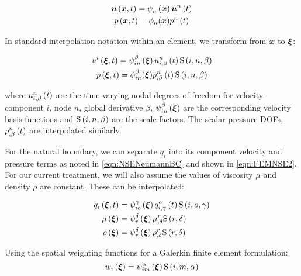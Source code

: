 \begin{gather}
  \fnof{\vectr{u}}{\vectr{x},t}=\gbfn{n}{}{\vectr{x}}\fnof{\nodept{\vectr{u}}{n}}{t}\\
  \fnof{p}{\vectr{x},t}=\phi_{n}({\vectr{x}})\fnof{\nodept{p}{n}}{t}
\end{gather}

In standard interpolation notation within an element, we transform from
$\vectr{x}$ to $\vectr{\xi}$:

\begin{gather}
  \fnof{u^{i}}{\vectr{\xi},t}=\idxgbfn{i}{n}{\beta}{\vectr{\xi}}
  \fnof{\idxnodedof{u}{i}{n}{\beta}}{t}\idxgsf{i}{n}{\beta}\\
  \fnof{p}{\vectr{\xi},t}=\phi_{in}^{\beta}({\vectr{\xi}})
  \fnof{\idxnodedof{p}{}{n}{\beta}}{t}\idxgsf{i}{n}{\beta}
\end{gather}

where $\fnof{\idxnodedof{u}{i}{n}{\beta}}{t}$ are the time varying nodal
degrees-of-freedom for velocity component $i$, node $n$, global derivative
$\beta$, $\idxgbfn{i}{n}{\beta}{\vectr{\xi}}$ are the corresponding velocity
basis functions and $\idxgsf{i}{n}{\beta}$ are the scale factors. The scalar
pressure DOFs, $\fnof{\idxnodedof{p}{}{n}{\beta}}{t}$ are interpolated
similarly.

For the natural boundary, we can separate $q_i$ into its component velocity
and pressure terms as noted in \ref{eqn:NSENeumannBC} and shown in
\ref{eqn:FEMNSE2}. For our current treatment, we will also assume the values
of viscosity $\mu$ and density $\rho$ are constant. These can be interpolated:

\begin{equation}
  \begin{split}
    \fnof{q_{i}}{\vectr{\xi},t} &= \idxgbfn{i}{o}{\gamma}{\vectr{\xi}}
      \fnof{\idxnodedof{q}{i}{o}{\gamma}}{t}\idxgsf{i}{o}{\gamma} \\
    \fnof{\mu}{\vectr{\xi}} &=\gbfn{r}{\delta}{\vectr{\xi}}
    \nodedof{\mu}{r}{\delta}\gsf{r}{\delta} \\
    \fnof{\rho}{\vectr{\xi}} &=\gbfn{r}{\delta}{\vectr{\xi}}\nodedof{\rho}{r}{\delta}
    \gsf{r}{\delta} \\
  \end{split}
\end{equation}

Using the spatial weighting functions for a Galerkin finite element
formulation:
\begin{equation}
  \fnof{w_{i}}{\vectr{\xi}}=\idxgbfn{i}{m}{\alpha}{\vectr{\xi}}\idxgsf{i}{m}{\alpha}
\end{equation}


